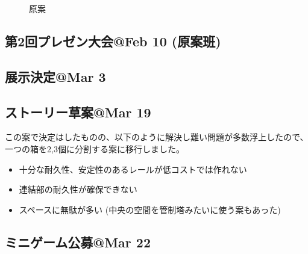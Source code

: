 \documentclass{jsarticle}
\begin{document}
\begin{figure}[h]
    \centering
    \caption{原案}
    \label{figs:原案}
\end{figure}


\subsection{第2回プレゼン大会@Feb 10 (原案班)}
\subsection{展示決定@Mar 3}
\subsection{ストーリー草案@Mar 19}

\clearpage

この案で決定はしたものの、以下のように解決し難い問題が多数浮上したので、一つの箱を2,3個に分割する案に移行しました。

\begin{itemize}
    \item 十分な耐久性、安定性のあるレールが低コストでは作れない
    \item 連結部の耐久性が確保できない
    \item スペースに無駄が多い (中央の空間を管制塔みたいに使う案もあった)
\end{itemize}

\subsection{ミニゲーム公募@Mar 22}
\end{document}
